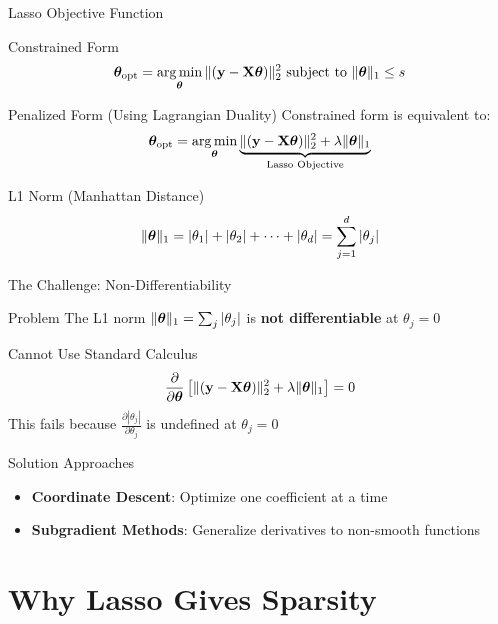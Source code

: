 \documentclass{beamer}
\begin{document}
\begin{frame}{Lasso Objective Function}
\footnotesize
\begin{definitionbox}{Constrained Form}
$$\boldsymbol{\theta}_{\text{opt}} = \operatorname*{arg\,min}_{\boldsymbol{\theta}} \|(\mathbf{y}-\mathbf{X}\boldsymbol{\theta})\|_2^2 \text{ subject to } \|\boldsymbol{\theta}\|_1 \leq s$$
\end{definitionbox}
\pause

\begin{theorembox}{Penalized Form (Using Lagrangian Duality)}
Constrained form is equivalent to:
$$\boldsymbol{\theta}_{\text{opt}} = \operatorname*{arg\,min}_{\boldsymbol{\theta}} \underbrace{\|(\mathbf{y}-\mathbf{X}\boldsymbol{\theta})\|_2^2 + \lambda \|\boldsymbol{\theta}\|_1}_{\text{Lasso Objective}}$$
\end{theorembox}
\pause

\begin{codebox}{L1 Norm (Manhattan Distance)}
$$\|\boldsymbol{\theta}\|_1 = |\theta_1| + |\theta_2| + \cdots + |\theta_d| = \sum_{j=1}^d |\theta_j|$$
\end{codebox}
\end{frame}

\begin{frame}{The Challenge: Non-Differentiability}
\footnotesize
\begin{alertbox}{Problem}
The L1 norm $\|\boldsymbol{\theta}\|_1 = \sum_j |\theta_j|$ is \textbf{not differentiable} at $\theta_j = 0$
\end{alertbox}
\pause

\begin{codebox}{Cannot Use Standard Calculus}
$$\frac{\partial}{\partial \boldsymbol{\theta}} \left[ \|(\mathbf{y}-\mathbf{X}\boldsymbol{\theta})\|_2^2 + \lambda \|\boldsymbol{\theta}\|_1 \right] = 0$$
This fails because $\frac{\partial |\theta_j|}{\partial \theta_j}$ is undefined at $\theta_j = 0$
\end{codebox}

\begin{keypointsbox}{Solution Approaches}
{\small
\begin{itemize}
\item \textbf{Coordinate Descent}: Optimize one coefficient at a time
\item \textbf{Subgradient Methods}: Generalize derivatives to non-smooth functions
\end{itemize}
}
\end{keypointsbox}
\end{frame}

\section{Why Lasso Gives Sparsity}
\end{document}
